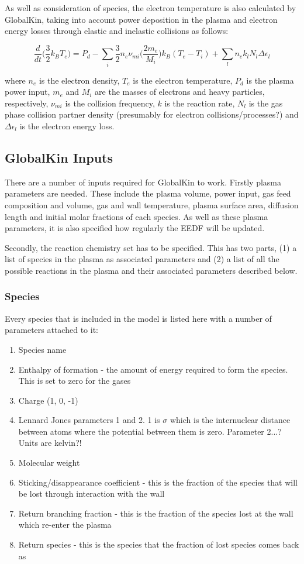 \documentclass[11pt, oneside]{article}   	%
\begin{document}
As well as consideration of species, the electron temperature is also calculated by GlobalKin, taking into account power deposition in the plasma and electron energy losses through elastic and inelastic collisions as follows:

\begin{equation}
\frac{d}{dt}\Big(\frac{3}{2}k_BT_e\Big) = P_d - \sum_i\frac{3}{2}n_e\nu_{mi}\Big(\frac{2m_e}{M_i}\Big)k_B(T_e - T_i) + \sum_l n_ek_lN_l\Delta\epsilon_l
\label{ElectronTempEqn}
\end{equation}

where $n_e$ is the electron density, $T_e$ is the electron temperature, $P_d$ is the plasma power input, $m_e$ and $M_i$ are the masses of electrons and heavy particles, respectively, $\nu_{mi}$ is the collision frequency, $k$ is the reaction rate, $N_l$ is the gas phase collision partner density (presumably for electron collisions/processes?) and $\Delta\epsilon_l$ is the electron energy loss.

\subsection{GlobalKin Inputs}
There are a number of inputs required for GlobalKin to work.
Firstly plasma parameters are needed.
These include the plasma volume, power input, gas feed composition and volume, gas and wall temperature, plasma surface area, diffusion length and initial molar fractions of each species.
As well as these plasma parameters, it is also specified how regularly the EEDF will be updated.

Secondly, the reaction chemistry set has to be specified. 
This has two parts, (1) a list of species in the plasma as associated parameters and (2) a list of all the possible reactions in the plasma and their associated parameters described below.

\subsubsection{Species}
Every species that is included in the model is listed here with a number of parameters attached to it:
\begin{enumerate}
\item Species name
\item Enthalpy of formation - the amount of energy required to form the species. This is set to zero for the gases
\item Charge (1, 0, -1)
\item Lennard Jones parameters 1 and 2. 1 is $\sigma$ which is the internuclear distance between atoms where the potential between them is zero. Parameter 2...? Units are kelvin?!
\item Molecular weight
\item Sticking/disappearance coefficient - this is the fraction of the species that will be lost through interaction with the wall
\item Return branching fraction - this is the fraction of the species lost at the wall which re-enter the plasma
\item Return species - this is the species that the fraction of lost species comes back as
\end{enumerate}
\end{document}
